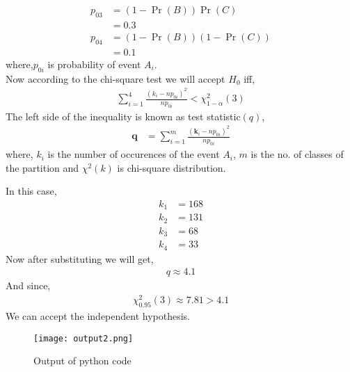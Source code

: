 \documentclass{beamer}
\providecommand{\pr}[1]{\ensuremath{\Pr\left(#1\right)}}
\providecommand{\brak}[1]{\ensuremath{\left(#1\right)}}
\begin{document}
\begin{frame}
             \begin{align}
             p_{03} &= \brak{1-\pr{B}}\pr{C}\\
                          &= 0.3\\
             p_{04} &= \brak{1-\pr{B}}\brak{1-\pr{C}}\\
                          &= 0.1
           \end{align}
where,$p_{0i}$ is probability of event $A_{i}$.\\
  Now according to the chi-square test we will accept $H_{0}$ iff,
           \begin{align}
             \sum_{i=1}^{4}\frac{\brak{k_{i} - np_{0i}}^{2}}{np_{0i}} < \chi_{1-\alpha}^{2}\brak{3}
            \end{align}
The left side of the inequality is known as test statistic$\brak{q}$,
            \begin{align}
               \mathbf{q} &=  \sum_{i=1}^{m}\frac{\brak{\mathbf{k}_{i} - np_{0i}}^{2}}{np_{0i}}
            \end{align}
  where,
        $k_{i}$ is the number of occurences of the event $A_{i}$, $m$ is the no. of classes of the partition and $\chi^{2}\brak{k}$ is chi-square distribution.
\end{frame}

\begin{frame}
In this case,
       \begin{align}
          k_{1} &= 168\\
          k_{2} &= 131\\
          k_{3} &= 68\\
          k_{4} & = 33
       \end{align}
   Now after substituting we will get,
        \begin{align}
           q \approx 4.1
        \end{align}
  And since,
       \begin{align}
           \chi^{2}_{0.95}\brak{3} \approx 7.81 > 4 .1
       \end{align}
  We can accept the independent hypothesis.
\end{frame}

\begin{frame}
        \begin{figure}
           \centering
           \texttt{[image: output2.png]}
           \caption{Output of python code}
           \label{Figure 1}
         \end{figure}
\end{frame}
 
\end{document}
